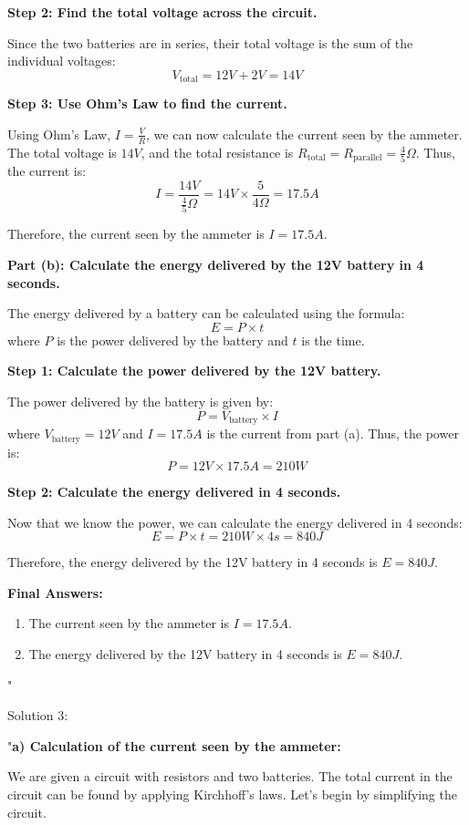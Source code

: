 \textbf{Step 2: Find the total voltage across the circuit.}

Since the two batteries are in series, their total voltage is the sum of the individual voltages:
\[
V_{\text{total}} = 12V + 2V = 14V
\]

\textbf{Step 3: Use Ohm's Law to find the current.}

Using Ohm's Law, \(I = \frac{V}{R}\), we can now calculate the current seen by the ammeter. The total voltage is \(14V\), and the total resistance is \(R_{\text{total}} = R_{\text{parallel}} = \frac{4}{5}Ω\). Thus, the current is:
\[
I = \frac{14V}{\frac{4}{5}Ω} = 14V \times \frac{5}{4Ω} = 17.5A
\]

Therefore, the current seen by the ammeter is \(I = 17.5A\).

\textbf{Part (b): Calculate the energy delivered by the 12V battery in 4 seconds.}

The energy delivered by a battery can be calculated using the formula:
\[
E = P \times t
\]
where \(P\) is the power delivered by the battery and \(t\) is the time.

\textbf{Step 1: Calculate the power delivered by the 12V battery.}

The power delivered by the battery is given by:
\[
P = V_{\text{battery}} \times I
\]
where \(V_{\text{battery}} = 12V\) and \(I = 17.5A\) is the current from part (a). Thus, the power is:
\[
P = 12V \times 17.5A = 210W
\]

\textbf{Step 2: Calculate the energy delivered in 4 seconds.}

Now that we know the power, we can calculate the energy delivered in 4 seconds:
\[
E = P \times t = 210W \times 4s = 840J
\]

Therefore, the energy delivered by the 12V battery in 4 seconds is \(E = 840J\).

\textbf{Final Answers:}
\begin{enumerate}
    \item The current seen by the ammeter is \(I = 17.5A\).
    \item The energy delivered by the 12V battery in 4 seconds is \(E = 840J\).
\end{enumerate}"

Solution 3:

"\textbf{a) Calculation of the current seen by the ammeter:}

We are given a circuit with resistors and two batteries. The total current in the circuit can be found by applying Kirchhoff’s laws. Let’s begin by simplifying the circuit.

